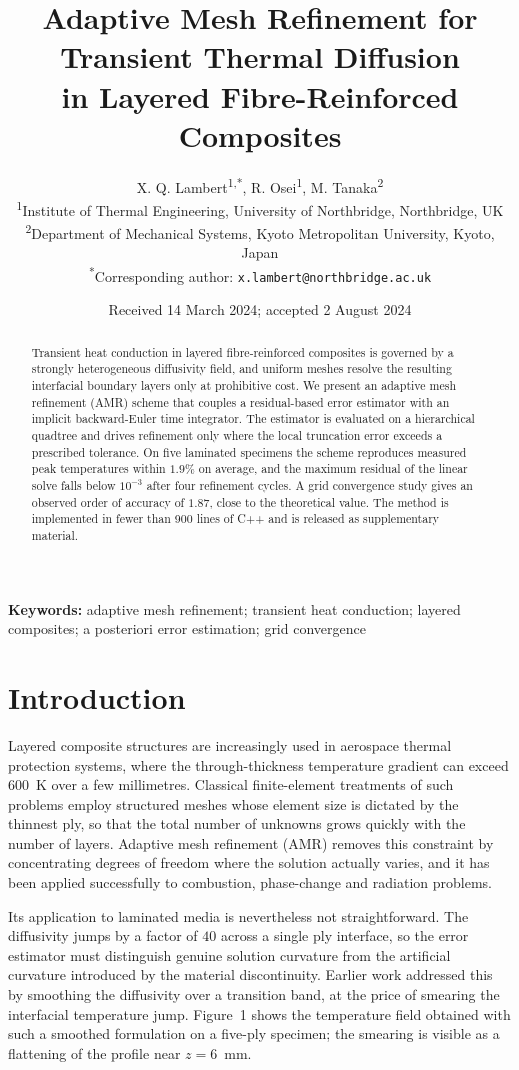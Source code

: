 \documentclass[11pt,a4paper]{article}
\title{\bfseries Adaptive Mesh Refinement for Transient Thermal Diffusion\\ in Layered Fibre-Reinforced Composites}
\author{X. Q. Lambert\textsuperscript{1,*}, R. Osei\textsuperscript{1}, M. Tanaka\textsuperscript{2}\\[2pt]
\small \textsuperscript{1}Institute of Thermal Engineering, University of Northbridge, Northbridge, UK\\
\small \textsuperscript{2}Department of Mechanical Systems, Kyoto Metropolitan University, Kyoto, Japan\\
\small \textsuperscript{*}Corresponding author: \texttt{x.lambert@northbridge.ac.uk}}
\date{Received 14 March 2024; accepted 2 August 2024}
\begin{document}
\maketitle
\thispagestyle{empty}

\begin{abstract}
\noindent
Transient heat conduction in layered fibre-reinforced composites is governed by a
strongly heterogeneous diffusivity field, and uniform meshes resolve the resulting
interfacial boundary layers only at prohibitive cost. We present an adaptive mesh
refinement (AMR) scheme that couples a residual-based error estimator with an
implicit backward-Euler time integrator. The estimator is evaluated on a
hierarchical quadtree and drives refinement only where the local truncation error
exceeds a prescribed tolerance. On five laminated specimens the scheme reproduces
measured peak temperatures within $1.9\%$ on average, and the maximum residual of
the linear solve falls below $10^{-3}$ after four refinement cycles. A grid
convergence study gives an observed order of accuracy of $1.87$, close to the
theoretical value. The method is implemented in fewer than 900 lines of C++ and is
released as supplementary material.
\end{abstract}

\noindent\textbf{Keywords:} adaptive mesh refinement; transient heat conduction;
layered composites; a posteriori error estimation; grid convergence

\section{Introduction}
Layered composite structures are increasingly used in aerospace thermal
protection systems, where the through-thickness temperature gradient can exceed
$600$~K over a few millimetres. Classical finite-element treatments of such
problems employ structured meshes whose element size is dictated by the thinnest
ply, so that the total number of unknowns grows quickly with the number of layers.
Adaptive mesh refinement (AMR) removes this constraint by concentrating degrees of
freedom where the solution actually varies, and it has been applied successfully to
combustion, phase-change and radiation problems.

Its application to laminated media is nevertheless not straightforward. The
diffusivity jumps by a factor of $40$ across a single ply interface, so the error
estimator must distinguish genuine solution curvature from the artificial curvature
introduced by the material discontinuity. Earlier work addressed this by smoothing
the diffusivity over a transition band, at the price of smearing the interfacial
temperature jump. Figure~1 shows the temperature field obtained with such a
smoothed formulation on a five-ply specimen; the smearing is visible as a
flattening of the profile near $z = 6$~mm.
\end{document}
